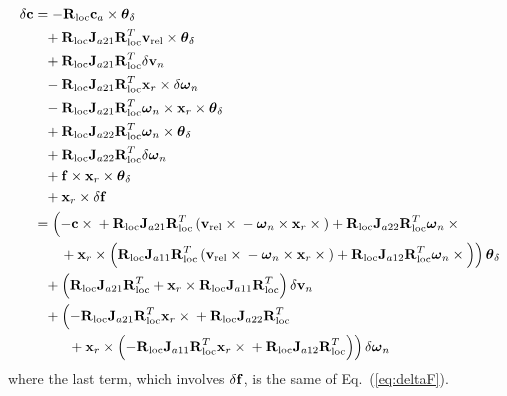 \begin{align}
	\delta\bm{\mathbf{c}} &= 
	- \bm{\mathbf{R}}_{\text{loc}}\bm{\mathbf{c}}_a\times\bm{\mathbf{\theta}}_\delta
	\nonumber \\
	&\hphantom{= }+ \bm{\mathbf{R}}_{\text{loc}}\bm{\mathbf{J}}_{a21}\bm{\mathbf{R}}^T_{\text{loc}}\bm{\mathbf{v}}_{\text{rel}}\times\bm{\mathbf{\theta}}_\delta
	\nonumber \\
	&\hphantom{= }+ \bm{\mathbf{R}}_{\text{loc}}\bm{\mathbf{J}}_{a21}\bm{\mathbf{R}}^T_{\text{loc}}\delta\bm{\mathbf{v}}_n
	\nonumber \\
	&\hphantom{= }- \bm{\mathbf{R}}_{\text{loc}}\bm{\mathbf{J}}_{a21}\bm{\mathbf{R}}^T_{\text{loc}}
		\bm{\mathbf{x}}_r\times\delta\bm{\mathbf{\omega}}_n
	\nonumber \\
	&\hphantom{= }- \bm{\mathbf{R}}_{\text{loc}}\bm{\mathbf{J}}_{a21}\bm{\mathbf{R}}^T_{\text{loc}}
		\bm{\mathbf{\omega}}_n\times\bm{\mathbf{x}}_r\times\bm{\mathbf{\theta}}_\delta
	\nonumber \\
	&\hphantom{= }+ \bm{\mathbf{R}}_{\text{loc}}\bm{\mathbf{J}}_{a22}\bm{\mathbf{R}}^T_{\text{loc}}\bm{\mathbf{\omega}}_n
		\times\bm{\mathbf{\theta}}_\delta
	\nonumber \\
	&\hphantom{= }+ \bm{\mathbf{R}}_{\text{loc}}\bm{\mathbf{J}}_{a22}\bm{\mathbf{R}}^T_{\text{loc}}\delta\bm{\mathbf{\omega}}_n
	\nonumber \\
	&\hphantom{= }+ \bm{\mathbf{f}}\times\bm{\mathbf{x}}_r\times\bm{\mathbf{\theta}}_\delta
	\nonumber \\
	&\hphantom{= }+ \bm{\mathbf{x}}_r \times \delta\bm{\mathbf{f}}
	\nonumber \\
	&=
	\left( 
		- \bm{\mathbf{c}}\times{}
		+ \bm{\mathbf{R}}_{\text{loc}}\bm{\mathbf{J}}_{a21}\bm{\mathbf{R}}^T_{\text{loc}} \left( 
			\bm{\mathbf{v}}_{\text{rel}}\times{}
			- \bm{\mathbf{\omega}}_n\times\bm{\mathbf{x}}_r\times{}
		 \right)
		+ \bm{\mathbf{R}}_{\text{loc}}\bm{\mathbf{J}}_{a22}\bm{\mathbf{R}}^T_{\text{loc}}\bm{\mathbf{\omega}}_n\times{}
	 \right.
	\nonumber \\
	&\hphantom{= }\left. \mbox{\hspace{3mm}} + \bm{\mathbf{x}}_r \times 
	\left( 
		\bm{\mathbf{R}}_{\text{loc}}\bm{\mathbf{J}}_{a11}\bm{\mathbf{R}}^T_{\text{loc}}\left( 
			\bm{\mathbf{v}}_{\text{rel}}\times{}
			- \bm{\mathbf{\omega}}_n\times\bm{\mathbf{x}}_r\times{}
		 \right)
		+ \bm{\mathbf{R}}_{\text{loc}}\bm{\mathbf{J}}_{a12}\bm{\mathbf{R}}^T_{\text{loc}}\bm{\mathbf{\omega}}_n\times{}
	 \right) \right) \bm{\mathbf{\theta}}_\delta
	\nonumber \\
	&\hphantom{= }+ \left( 
		\bm{\mathbf{R}}_{\text{loc}}\bm{\mathbf{J}}_{a21}\bm{\mathbf{R}}^T_{\text{loc}}
		+ \bm{\mathbf{x}}_r \times \bm{\mathbf{R}}_{\text{loc}}\bm{\mathbf{J}}_{a11}\bm{\mathbf{R}}^T_{\text{loc}}
	 \right) \delta\bm{\mathbf{v}}_n
	\nonumber \\
	&\hphantom{= }+ \left( 
		- \bm{\mathbf{R}}_{\text{loc}}\bm{\mathbf{J}}_{a21}\bm{\mathbf{R}}^T_{\text{loc}}\bm{\mathbf{x}}_r\times{}
		+ \bm{\mathbf{R}}_{\text{loc}}\bm{\mathbf{J}}_{a22}\bm{\mathbf{R}}^T_{\text{loc}}
	 \right.
	\nonumber \\
	&\hphantom{= } \left. 
		\mbox{\hspace{5mm}} + \bm{\mathbf{x}}_r \times \left( 
		- \bm{\mathbf{R}}_{\text{loc}}\bm{\mathbf{J}}_{a11}\bm{\mathbf{R}}^T_{\text{loc}} \bm{\mathbf{x}}_r\times{}
		+ \bm{\mathbf{R}}_{\text{loc}}\bm{\mathbf{J}}_{a12}\bm{\mathbf{R}}^T_{\text{loc}}
	 \right) \right) \delta\bm{\mathbf{\omega}}_n
\end{align}
where the last term, which involves $\delta\bm{\mathbf{f}}$, is the same of
Eq.~(\ref{eq:deltaF}).

